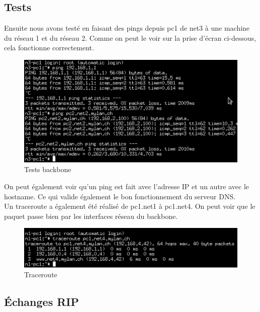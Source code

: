 \documentclass{article}
\begin{document}
\clearpage

\subsection{Tests}

Ensuite nous avons testé en faisant des pings depuis pc1 de net3 à une machine du réseau 1 et du réseau 2. Comme on peut le voir sur la prise d'écran ci-dessous, cela fonctionne correctement.

\begin{figure}[!h]
	\centering
	\includegraphics{./captures/test-zebra-from-pc.png}
	\caption{Tests backbone}
	\label{fig:Tests backbone}
\end{figure}

On peut également voir qu'un ping est fait avec l'adresse IP et un autre avec le hostname. Ce qui valide également le bon fonctionnement du serveur DNS.\\

Un traceroute a également été réalisé de pc1.net1 à pc1.net4. On peut voir que le paquet passe bien par les interfaces réseau du backbone.

\begin{figure}[!h]
	\centering
	\includegraphics{./captures/traceroutepc1-net4.png}
	\caption{Traceroute}
	\label{fig:Traceroute}
\end{figure}

\clearpage

\subsection{Échanges RIP}
\end{document}
